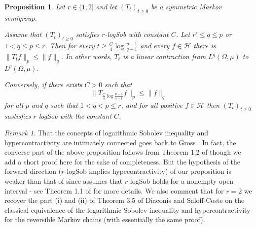 \documentclass[11pt]{amsart}
\newcommand{\1}{\mathbf{1}}
\def\H{{\mathcal{H}}}
\theoremstyle{definition}
\theoremstyle{plain}
\newtheorem{proposition}[example]{Proposition}
\theoremstyle{remark}
\newtheorem{remark}[example]{Remark}
\numberwithin{equation}{section}
\begin{document}
\begin{proposition} \label{hyp}
Let $r \in (1,2]$ and let $(T_{t})_{t \geq 0}$ be a symmetric Markov semigroup.

Assume that $(T_{t})_{t \geq 0}$ satisfies $r$-logSob with constant $C$. Let
$r' \leq q \leq p$ or $1<q \leq p \leq r$. Then for every
$t \geq \frac{C}{4}\log \frac{p-1}{q-1}$ and every
$f \in \H$ there is
$\| T_{t}f\|_{p} \leq \| f\|_{q}$. In other words, $T_{t}$ is a linear contraction from $L^{q}(\Omega, \mu)$ to
$L^{p}(\Omega,\mu)$.

Conversely, if there exists $C>0$ such that
\begin{equation} \label{ass}
\| T_{\frac{C}{4}\log \frac{p-1}{q-1}}f\|_{p} \leq
\| f\|_{q}
\end{equation}
for all $p$ and $q$ such that $1<q<p \leq r$, and for all positive $f \in \H$  then $(T_{t})_{t \geq 0}$ sastisfies
$r$-logSob with the constant $C$.

\end{proposition}

\begin{remark}
That the concepts of logarithmic  Sobolev inequality  and hypercontractivity are intimately connected goes back to Gross \cite{Gross:75}. In fact, the converse part of the above proposition  follows from Theorem 1.2 of \cite{Gross:75} though we add a short proof here for the sake of completeness. But the hypothesis of the forward direction ($r$-logSob implies hypecontractivity)  of our proposition is weaker  than that of  \cite{Gross:75}  since \cite{Gross:75} assumes that $r$-logSob holds for  a nonempty open interval -  see Theorem 1.1 of \cite{Gross:75} for more details. 
 We also comment that for $r=2$ we recover the part (i) and (ii) of Theorem 3.5 of Diaconis and Saloff-Coste \cite{DiaconisSaloff-Coste:96} on the classical equivalence of the logarithmic Sobolev inequality and hypercontractivity for the reversible Markov chains (with essentially the same proof).
\end{remark}
\end{document}
